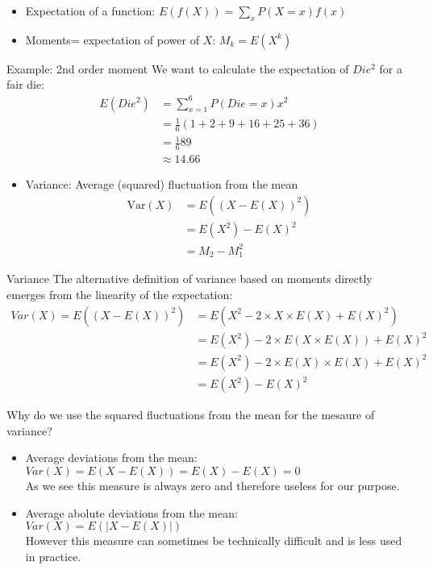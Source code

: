\begin{itemize}
\item Expectation of a function:  $E(f(X))= \sum_{x} P(X=x) f(x)$ 
\item Moments= expectation of power of $X$: $M_k= E(X^k)$
\end{itemize}

\begin{bbbox}{Example: 2nd order moment}
	We want to calculate the expectation of $Die^2$ for a fair die: \\
	\begin{align*}
		E(Die^2) &= \sum_{x = 1}^6 P(Die = x) x^2 \\
				 &= \frac{1}{6} (1 + 2 + 9 + 16 + 25 + 36) \\
				 &= \frac{1}{6} 89 \\
				 &\approx 14.66			 
	\end{align*}
\end{bbbox}

\begin{itemize}
\item Variance: Average (squared) fluctuation from the mean
\begin{align}
 \mbox{Var}(X)&= E((X-E(X))^2)\\
 &= E(X^2)- E(X)^2\\
 &= M_2-M_1^2
\end{align}
\end{itemize}

\begin{bbbox}{Variance}
The alternative definition of variance based on moments directly emerges from the linearity of the expectation:
	\begin{align*}
		Var(X) = E((X - E(X))^2) &= E(X^2 - 2 \times X \times E(X) + E(X)^2) \\
						&= E(X^2) - 2 \times E(X \times E(X)) + E(X)^2 \\
						&= E(X^2) - 2 \times E(X) \times E(X) + E(X)^2 \\
						&= E(X^2) - E(X)^2
	\end{align*}
\end{bbbox}

\begin{bbbox}{Why do we use the squared fluctuations from the mean for the mesaure of variance?}
	
	\begin{itemize}
		\item Average deviations from the mean: \\
			  $Var(X) = E(X-E(X)) = E(X) - E(X) = 0$ \\
			  As we see this measure is always zero and therefore useless for our purpose.
		\item Average abolute deviations from the mean: 
			  \\$Var(X) = E(|X-E(X)|)$ \\
			  However this measure can sometimes be technically difficult and is less used in practice.
	\end{itemize}

\end{bbbox}

